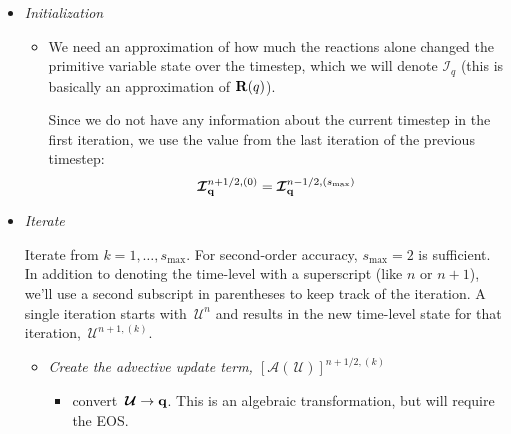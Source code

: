 \documentclass[times,modern]{aastex63}
\newcommand{\Ic}{{\boldsymbol{\mathcal{I}}}}
\newcommand{\smax}{{s_\mathrm{max}}}
\newcommand{\Uc}{{\,\bm{\mathcal{U}}}}
\newcommand{\qb}{{\bf q}}
\newcommand{\Rb}{{\bf R}}
\newcommand{\Adv}[1]{{\left [\boldsymbol{\mathcal{A}} \left(#1\right)\right]}}
\begin{document}
\begin{itemize}

\item {\em Initialization}

\label{sec:initialization}

  \begin{itemize}
  \item We need an approximation of how much the reactions alone
    changed the primitive variable state over the timestep, which we
    will denote $\Ic_q$ (this is basically an approximation of
    $\Rb(q)$).

    Since we do not have any information about the current
    timestep in the first iteration, we use the value from the last
    iteration of the previous timestep:
    \begin{equation}
      \Ic^{n+1/2,(0)}_{\qb} = \Ic^{n-1/2,(\smax)}_{\qb}
    \end{equation}


  \end{itemize}

\item {\em Iterate}

  Iterate from $k = 1, \ldots, \smax$.  For second-order accuracy,
  $\smax = 2$ is sufficient.  In addition to denoting the time-level
  with a superscript (like $n$ or $n+1$), we'll use a second subscript
  in parentheses to keep track of the iteration.  A single iteration
  starts with $\Uc^n$ and results in the new time-level state for that
  iteration, $\Uc^{n+1,(k)}$.

  \begin{itemize}
  \item {\em Create the advective update term, $\Adv{\Uc}^{n+1/2,(k)}$}

    \begin{itemize}
    \item convert $\Uc \rightarrow \qb$.  This is an algebraic transformation,
      but will require the EOS.


\end{itemize}
\end{itemize}
\end{itemize}
\end{document}
